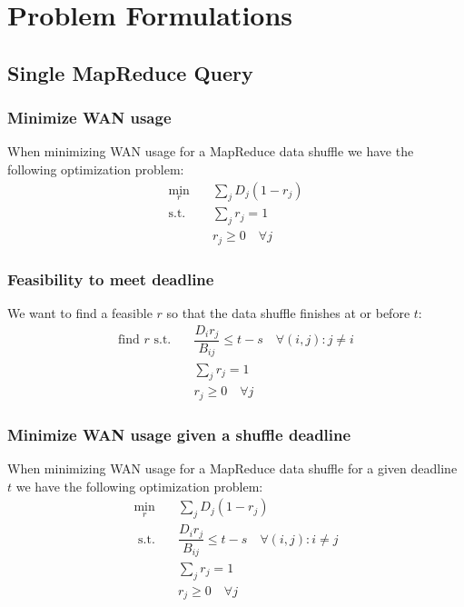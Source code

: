 \section{Problem Formulations}
\label{sec:problem}

\subsection{Single MapReduce Query}

\subsubsection*{Minimize WAN usage}

When minimizing WAN usage for a MapReduce data shuffle we have the following optimization problem:
\begin{subequations}
	\begin{align}
		\min_{r} \quad & \sum_{j}D_j(1-r_j) \\
		\text{s.t.} \quad & \sum_{j}r_{j} = 1 \\
		& r_{j} \geq 0 \quad \forall j
	\end{align}
\end{subequations}

\subsubsection*{Feasibility to meet deadline}

We want to find a feasible $r$ so that the data shuffle finishes at or before $t$:
\begin{subequations}
	\begin{align}
		\text{find } r \text{ s.t.} \quad & \dfrac{D_{i}r_{j}}{B_{ij}} \leq t - s \quad \forall (i,j):j\neq i \\
		& \sum_{j}r_{j} = 1 \\
		& r_{j} \geq 0 \quad \forall j
	\end{align}
\end{subequations}

\subsubsection*{Minimize WAN usage given a shuffle deadline}
When minimizing WAN usage for a MapReduce data shuffle for a given deadline $t$ we have the following optimization problem:
\begin{subequations}\label{eq:opt_1Q_MR_WAN_deadline}
	\begin{align}
		\min_{r} \quad & \sum_{j}D_j(1-r_j) \\
		\text{ s.t.} \quad & \dfrac{D_{i}r_{j}}{B_{ij}} \leq t - s \quad \forall (i,j):i\neq j \\
		& \sum_{j}r_{j} = 1 \\
		& r_{j} \geq 0 \quad \forall j
	\end{align}
\end{subequations}

